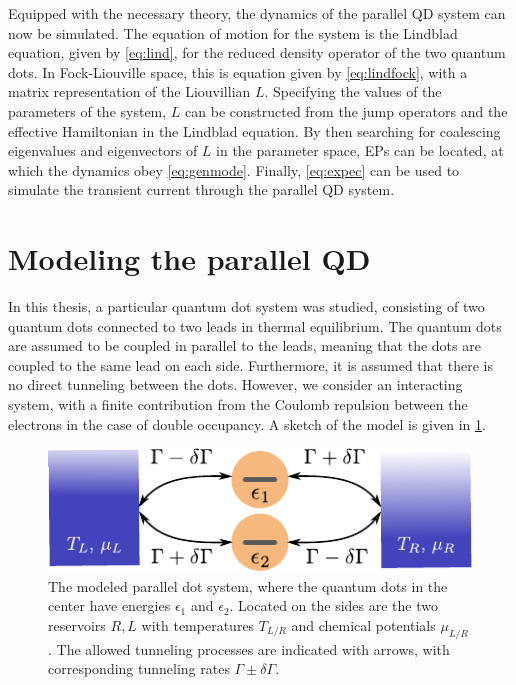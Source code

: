 \documentclass[../main.tex]{subfiles}
\begin{document}
Equipped with the necessary theory, the dynamics of the parallel QD system can now be simulated. The equation of motion for the system is the Lindblad equation, given by \cref{eq:lind}, for the reduced density operator of the two quantum dots. In Fock-Liouville space, this is equation given by \cref{eq:lindfock}, with a matrix representation of the Liouvillian $L$. Specifying the values of the parameters of the system, $L$ can be constructed from the jump operators and the effective Hamiltonian in the Lindblad equation. By then searching for coalescing eigenvalues and eigenvectors of $L$ in the parameter space, EPs can be located, at which the dynamics obey \cref{eq:genmode}. Finally, \cref{eq:expec} can be used to simulate the transient current through the parallel QD system.
\section{Modeling the parallel QD}
In this thesis, a particular quantum dot system was studied, consisting of two quantum dots connected to two leads in thermal equilibrium. The quantum dots are assumed to be coupled in parallel to the leads, meaning that the dots are coupled to the same lead on each side. Furthermore, it is assumed that there is no direct tunneling between the dots. However, we consider an interacting system, with a finite contribution from the Coulomb repulsion between the electrons in the case of double occupancy. A sketch of the model is given in \cref{fig:model}.
\begin{figure}[H] \centering
    \includegraphics[width=0.8\linewidth]{figures/model.pdf}
    \caption{The modeled parallel dot system, where the quantum dots in the center have energies $\epsilon_1$ and $\epsilon_2$. Located on the sides are the two reservoirs $R,L$ with temperatures $T_{L/R}$ and chemical potentials $\mu_{L/R}$. The allowed tunneling processes are indicated with arrows, with corresponding tunneling rates $\Gamma \pm \delta\Gamma$.}
    \label{fig:model}
\end{figure}
\end{document}
